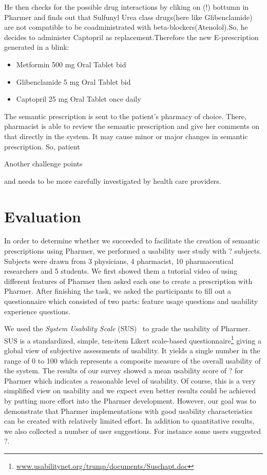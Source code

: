 \documentclass[10pt, conference, compsocconf]{IEEEtran}
\begin{document}
He then checks for the possible drug interactions by cliking on (!) bottumn in Pharmer and finds out that Sulfunyl Urea class drugs(here like Glibenclamide) are not compatible to be coadministrated with beta-blockers(Atenolol).So, he decides to administer Captopril as replacement.Therefore the new E-prescription generated in a blink:

\begin{itemize}
\item {Metformin} 500 mg Oral Tablet bid
\item {Glibenclamide} 5 mg Oral Tablet bid
\item {Captopril} 25 mg Oral Tablet once daily
\end{itemize}

The semantic prescription is sent to the patient's pharmacy of choice. There, pharmacist is able to review the semantic prescription and give her comments on that directly in the system. It may cause minor or major changes in semantic prescription. So, patient





Another challenge points

 and needs to be more carefully investigated by health care providers.




\section{Evaluation}
\label{evaluation}
In order to determine whether we succeeded to facilitate the creation of semantic prescriptions using Pharmer, we performed a usability user study with ? subjects.
Subjects were drawn from 3 physicians, 4 pharmacist, 10 pharmaceutical researchers and 5 students.
We first showed them a tutorial video of using different features of Pharmer then asked each one to create a prescription with Pharmer.
After finishing the task, we asked the participants to fill out a questionnaire which consisted of two parts: feature usage questions and usability experience questions.

We used the \emph{System Usability Scale} (SUS)~\cite{SUS2009} to grade the usability of Pharmer.
SUS is a standardized, simple, ten-item Likert scale-based questionnaire\footnote{\url{www.usabilitynet.org/trump/documents/Suschapt.doc}} giving a global view of subjective assessments of usability.
It yields a single number in the range of 0 to 100 which represents a composite measure of the overall usability of the system.
The results of our survey showed a mean usability score of ? for Pharmer which indicates a reasonable level of usability.
Of course, this is a very simplified view on usability and we expect even better results could be achieved by putting more effort into the Pharmer development.
However, our goal was to demonstrate that Pharmer implementations with good usability characteristics can be created with relatively limited effort.
In addition to quantitative results, we also collected a number of user suggestions.
For instance some users suggested ?.
\end{document}
